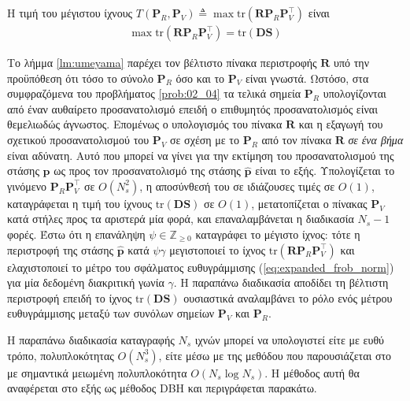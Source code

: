 \begin{corollary}
  \label{corollary:umeyama}
  Η τιμή του μέγιστου ίχνους
  $T(\bm{P}_R, \bm{P}_V) \triangleq \max\text{tr}(\bm{R} \bm{P}_R \bm{P}_V^\top)$
  είναι
  \begin{align}
  \max\text{tr}(\bm{R} \bm{P}_R \bm{P}_V^\top) = \text{tr}(\bm{D}\bm{S})
  \end{align}
\end{corollary}

Το λήμμα \ref{lm:umeyama} παρέχει τον βέλτιστο πίνακα περιστροφής $\bm{R}$ υπό
την προϋπόθεση ότι τόσο το σύνολο $\bm{P}_R$ όσο και το $\bm{P}_V$ είναι
γνωστά.  Ωστόσο, στα συμφραζόμενα του προβλήματος \ref{prob:02_04} τα τελικά
σημεία $\bm{P}_R$ υπολογίζονται από έναν αυθαίρετο προσανατολισμό επειδή ο
επιθυμητός προσανατολισμός είναι θεμελιωδώς άγνωστος. Επομένως ο υπολογισμός
του πίνακα $\bm{R}$ και η εξαγωγή  του σχετικού προσανατολισμού του $\bm{P}_V$
σε σχέση με το $\bm{P}_R$ από τον πίνακα $\bm{R}$ \textit{σε ένα βήμα} είναι
αδύνατη. Αυτό που μπορεί να γίνει για την εκτίμηση του προσανατολισμού της
στάσης $\bm{p}$ ως προς τον προσανατολισμό της στάσης $\hat{\bm{p}}$ είναι το
εξής. Υπολογίζεται το γινόμενο $\bm{P}_R \bm{P}_V^\top$ σε $O(N_s^2)$, η
αποσύνθεσή του σε ιδιάζουσες τιμές σε $O(1)$, καταγράφεται η τιμή του ίχνους
$\text{tr}(\bm{D}\bm{S})$ σε $O(1)$, μετατοπίζεται ο πίνακας $\bm{P}_V$ κατά
στήλες προς τα αριστερά μία φορά, και επαναλαμβάνεται η διαδικασία $N_s-1$
φορές. Έστω ότι η επανάληψη $\psi \in \mathbb{Z}_{\geq 0}$ καταγράφει το
μέγιστο ίχνος: τότε η περιστροφή της στάσης $\hat{\bm{p}}$ κατά $\psi \gamma$
μεγιστοποιεί το ίχνος $\text{tr}(\bm{R} \bm{P}_R \bm{P}_V^\top)$ και
ελαχιστοποιεί το μέτρο του σφάλματος ευθυγράμμισης
(\ref{eq:expanded_frob_norm}) για μία δεδομένη διακριτική γωνία $\gamma$. Η
παραπάνω διαδικασία αποδίδει τη βέλτιστη περιστροφή επειδή το ίχνος
$\text{tr}(\bm{D}\bm{S})$ ουσιαστικά αναλαμβάνει το ρόλο ενός μέτρου
ευθυγράμμισης μεταξύ των συνόλων σημείων $\bm{P}_V$ και $\bm{P}_R$.

Η παραπάνω διαδικασία καταγραφής $N_s$ ιχνών μπορεί να υπολογιστεί είτε με ευθύ
τρόπο, πολυπλοκότητας $O(N_s^3)$, είτε μέσω με της μεθόδου που παρουσιάζεται
στο \cite{Dogan2015} με σημαντικά μειωμένη πολυπλοκότητα $O(N_s \log N_s)$.  Η
μέθοδος αυτή θα αναφέρεται στο εξής ως μέθοδος DBH και περιγράφεται παρακάτω.


